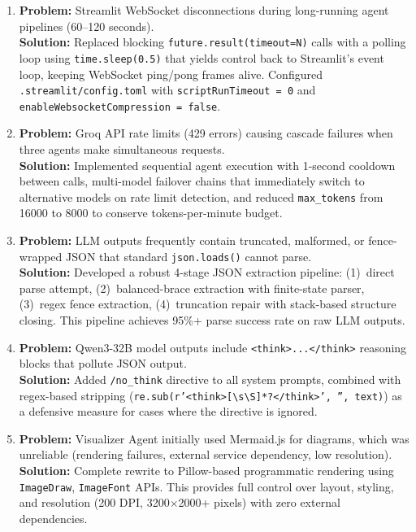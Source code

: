 \begin{enumerate}[label=\arabic*., leftmargin=2cm]
\item \textbf{Problem:} Streamlit WebSocket disconnections during long-running agent pipelines (60--120 seconds).\\
\textbf{Solution:} Replaced blocking \texttt{future.result(timeout=N)} calls with a polling loop using \texttt{time.sleep(0.5)} that yields control back to Streamlit's event loop, keeping WebSocket ping/pong frames alive. Configured \texttt{.streamlit/config.toml} with \texttt{scriptRunTimeout = 0} and \texttt{enableWebsocketCompression = false}.

\item \textbf{Problem:} Groq API rate limits (429 errors) causing cascade failures when three agents make simultaneous requests.\\
\textbf{Solution:} Implemented sequential agent execution with 1-second cooldown between calls, multi-model failover chains that immediately switch to alternative models on rate limit detection, and reduced \texttt{max\_tokens} from 16000 to 8000 to conserve tokens-per-minute budget.

\item \textbf{Problem:} LLM outputs frequently contain truncated, malformed, or fence-wrapped JSON that standard \texttt{json.loads()} cannot parse.\\
\textbf{Solution:} Developed a robust 4-stage JSON extraction pipeline: (1)~direct parse attempt, (2)~balanced-brace extraction with finite-state parser, (3)~regex fence extraction, (4)~truncation repair with stack-based structure closing. This pipeline achieves 95\%+ parse success rate on raw LLM outputs.

\item \textbf{Problem:} Qwen3-32B model outputs include \texttt{<think>...</think>} reasoning blocks that pollute JSON output.\\
\textbf{Solution:} Added \texttt{/no\_think} directive to all system prompts, combined with regex-based stripping (\texttt{re.sub(r'<think>[\textbackslash{}s\textbackslash{}S]*?</think>', '', text)}) as a defensive measure for cases where the directive is ignored.

\item \textbf{Problem:} Visualizer Agent initially used Mermaid.js for diagrams, which was unreliable (rendering failures, external service dependency, low resolution).\\
\textbf{Solution:} Complete rewrite to Pillow-based programmatic rendering using \texttt{ImageDraw}, \texttt{ImageFont} APIs. This provides full control over layout, styling, and resolution (200 DPI, 3200$\times$2000+ pixels) with zero external dependencies.


\end{enumerate}
